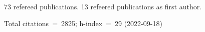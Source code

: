 73 refereed publications. 13 refeered publications as first author.

Total citations~=~2825; h-index~=~29 (2022-09-18)
